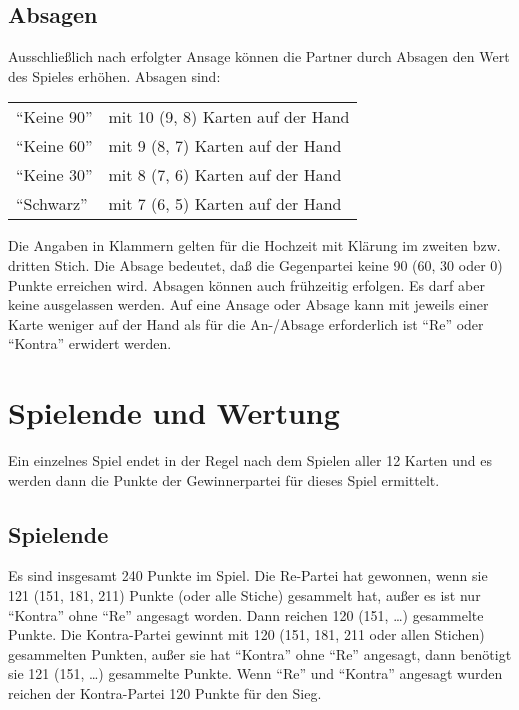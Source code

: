 \documentclass[12pt]{scrartcl}
\begin{document}
\subsection{Absagen}
Ausschließlich nach erfolgter Ansage können die Partner durch Absagen den Wert des Spieles erhöhen.
Absagen sind:
\begin{center}
  \begin{tabular}{ll}
    "`Keine 90"' & mit 10 (9, 8) Karten auf der Hand\\
    "`Keine 60"' & mit 9 (8, 7) Karten auf der Hand\\
    "`Keine 30"' & mit 8 (7, 6) Karten auf der Hand\\
    "`Schwarz"' & mit 7 (6, 5) Karten auf der Hand
  \end{tabular}
\end{center}
Die Angaben in Klammern gelten für die Hochzeit mit Klärung im zweiten bzw. dritten Stich. Die Absage bedeutet, daß die Gegenpartei keine 90 (60, 30 oder 0) Punkte erreichen wird. Absagen können auch frühzeitig erfolgen. Es darf aber keine ausgelassen werden. Auf eine Ansage oder Absage kann mit jeweils einer Karte weniger auf der Hand als für die An-/Absage erforderlich ist "`Re"' oder "`Kontra"' erwidert werden.

\section{Spielende und Wertung}
Ein einzelnes Spiel endet in der Regel nach dem Spielen aller 12 Karten und es werden dann die Punkte der Gewinnerpartei für dieses Spiel ermittelt.

\subsection{Spielende}
Es sind insgesamt 240 Punkte im Spiel. Die Re-Partei hat gewonnen, wenn sie 121 (151, 181, 211) Punkte (oder alle Stiche) gesammelt hat, außer es ist nur "`Kontra"' ohne "`Re"' angesagt worden. Dann reichen 120 (151, \dots) gesammelte Punkte. Die Kontra-Partei gewinnt mit 120 (151, 181, 211 oder allen Stichen) gesammelten Punkten, außer sie hat "`Kontra"' ohne "`Re"' angesagt, dann benötigt sie 121 (151, \dots) gesammelte Punkte. Wenn "`Re"' und "`Kontra"' angesagt wurden reichen der Kontra-Partei 120 Punkte für den Sieg.
\end{document}
